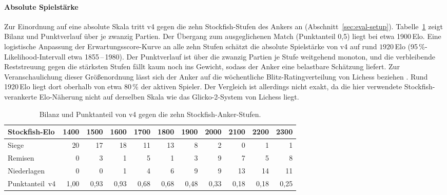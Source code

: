 \documentclass[
  a4paper, 12pt,
  parskip=half,
  headings=small,
  bibliography=totoc
]{scrartcl}
\begin{document}
\paragraph{Absolute Spielstärke}
Zur Einordnung auf eine absolute Skala tritt v4 gegen die zehn Stockfish-Stufen des
Ankers an (Abschnitt~\ref{sec:eval-setup}). Tabelle~\ref{tab:sl-anchor} zeigt
Bilanz und Punktverlauf über je zwanzig Partien. Der
Übergang zum ausgeglichenen Match (Punktanteil 0{,}5) liegt bei etwa 1900\,Elo. Eine
logistische Anpassung der Erwartungsscore-Kurve an alle zehn Stufen schätzt die
absolute Spielstärke von v4 auf rund \(1920\)\,Elo (95\,\%-Likelihood-Intervall etwa
1855\,--\,1980). Der Punktverlauf ist über die zwanzig Partien je Stufe weitgehend
monoton, und die verbleibende Reststreuung gegen die stärksten Stufen fällt kaum noch
ins Gewicht, sodass der Anker eine belastbare Schätzung liefert. Zur Veranschaulichung
dieser Größenordnung lässt sich der Anker auf die wöchentliche Blitz-Ratingverteilung
von Lichess beziehen \parencite{lichess_blitz_dist}. Rund 1920\,Elo liegt dort oberhalb
von etwa 80\,\% der aktiven Spieler. Der Vergleich ist allerdings nicht exakt,
da die hier verwendete Stockfish-verankerte Elo-Näherung nicht auf derselben Skala wie das
Glicko-2-System von Lichess liegt.

\begin{table}[htbp]
  \centering
  \small
  \begin{tabular}{lrrrrrrrrrr}
    \toprule
    Stockfish-Elo  & 1400 & 1500 & 1600 & 1700 & 1800 & 1900 & 2000 & 2100 & 2200 & 2300 \\
    \midrule
    Siege          &     20 &     17 &     18 &     11 &     13 &      8 &      2 &      0 &      1 &      1 \\
    Remisen        &      0 &      3 &      1 &      5 &      1 &      3 &      9 &      7 &      5 &      8 \\
    Niederlagen    &      0 &      0 &      1 &      4 &      6 &      9 &      9 &     13 &     14 &     11 \\
    \addlinespace
    Punktanteil~v4 & 1{,}00 & 0{,}93 & 0{,}93 & 0{,}68 & 0{,}68 & 0{,}48 & 0{,}33 & 0{,}18 & 0{,}18 & 0{,}25 \\
    \bottomrule
  \end{tabular}
  \caption{Bilanz und Punktanteil von v4 gegen die zehn Stockfish-Anker-Stufen.}
  \label{tab:sl-anchor}
\end{table}
\end{document}
